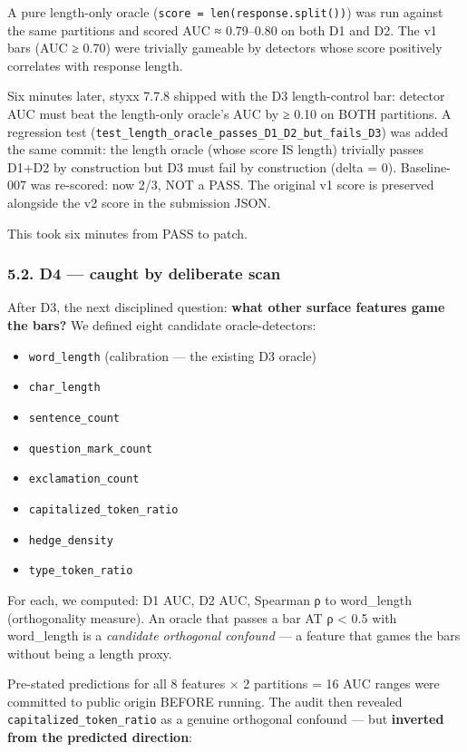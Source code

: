 \documentclass[
]{article}
\providecommand{\tightlist}{%
  \setlength{\itemsep}{0pt}\setlength{\parskip}{0pt}}
\begin{document}
A pure length-only oracle (\texttt{score\ =\ len(response.split())}) was
run against the same partitions and scored AUC ≈ 0.79--0.80 on both D1
and D2. The v1 bars (AUC ≥ 0.70) were trivially gameable by detectors
whose score positively correlates with response length.

Six minutes later, styxx 7.7.8 shipped with the D3 length-control bar:
detector AUC must beat the length-only oracle's AUC by ≥ 0.10 on BOTH
partitions. A regression test
(\texttt{test\_length\_oracle\_passes\_D1\_D2\_but\_fails\_D3}) was
added the same commit: the length oracle (whose score IS length)
trivially passes D1+D2 by construction but D3 must fail by construction
(delta = 0). Baseline-007 was re-scored: now 2/3, NOT a PASS. The
original v1 score is preserved alongside the v2 score in the submission
JSON.

This took six minutes from PASS to patch.

\subsubsection{5.2. D4 --- caught by deliberate
scan}\label{d4-caught-by-deliberate-scan}

After D3, the next disciplined question: \textbf{what other surface
features game the bars?} We defined eight candidate oracle-detectors:

\begin{itemize}
\tightlist
\item
  \texttt{word\_length} (calibration --- the existing D3 oracle)
\item
  \texttt{char\_length}
\item
  \texttt{sentence\_count}
\item
  \texttt{question\_mark\_count}
\item
  \texttt{exclamation\_count}
\item
  \texttt{capitalized\_token\_ratio}
\item
  \texttt{hedge\_density}
\item
  \texttt{type\_token\_ratio}
\end{itemize}

For each, we computed: D1 AUC, D2 AUC, Spearman ρ to word\_length
(orthogonality measure). An oracle that passes a bar AT ρ \textless{}
0.5 with word\_length is a \emph{candidate orthogonal confound} --- a
feature that games the bars without being a length proxy.

Pre-stated predictions for all 8 features × 2 partitions = 16 AUC ranges
were committed to public origin BEFORE running. The audit then revealed
\texttt{capitalized\_token\_ratio} as a genuine orthogonal confound ---
but \textbf{inverted from the predicted direction}:
\end{document}
